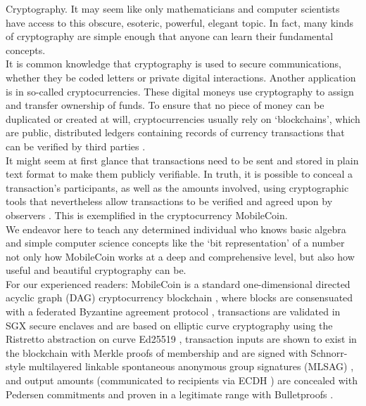 

Cryptography. It may seem like only mathematicians and computer scientists have access to this obscure, esoteric, powerful, elegant topic. In fact, many kinds of cryptography are simple enough that anyone can learn their fundamental concepts.
\\ \newline
It is common knowledge that cryptography is used to secure communications, whether they be coded letters or private digital interactions. Another application is in so-called cryptocurrencies. These digital moneys use cryptography to assign and transfer ownership of funds. To ensure that no piece of money can be duplicated or created at will, cryptocurrencies usually rely on `blockchains', which are public, distributed ledgers containing records of currency transactions that can be verified by third parties \cite{Nakamoto_bitcoin}.
\\ \newline
It might seem at first glance that transactions need to be sent and stored in plain text format to make them publicly verifiable. In truth, it is possible to conceal a transaction's participants, as well as the amounts involved, using cryptographic tools that nevertheless allow transactions to be verified and agreed upon by observers \cite{cryptoNoteWhitePaper}. This is exemplified in the cryptocurrency MobileCoin.
\\ \newline
We endeavor here to teach any determined individual who knows basic algebra and simple computer science concepts like the `bit representation' of a number not only how MobileCoin works at a deep and comprehensive level, but also how useful and beautiful cryptography can be.
\\ \newline
For our experienced readers: MobileCoin is a standard one-dimensional directed acyclic graph (DAG) cryptocurrency blockchain \cite{Nakamoto_bitcoin}, where blocks are consensuated with a federated Byzantine agreement protocol \cite{stellar-consensus-protocol}, transactions are validated in SGX secure enclaves \cite{intel-sgx-explained-advanced} and are based on elliptic curve cryptography using the Ristretto abstraction \cite{ristretto} on curve Ed25519 \cite{Bernstein2012-high-speed-high-security-ed25519}, transaction inputs are shown to exist in the blockchain with Merkle proofs of membership \cite{merkle-tree} and are signed with Schnorr-style multilayered linkable spontaneous anonymous group signatures (MLSAG) \cite{MRL-0005-ringct}, and output amounts (communicated to recipients via ECDH \cite{Diffie-Hellman}) are concealed with Pedersen commitments \cite{maxwell-ct-2} and proven in a legitimate range with Bulletproofs \cite{Bulletproofs_paper}.
